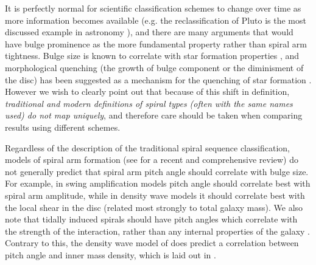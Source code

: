 \documentclass[usenatbib]{mn2e}
\begin{document}
It is perfectly normal for scientific classification schemes to change over time as more information becomes available (e.g. the reclassification of Pluto is the most discussed example in astronomy \citep{Messeri}), and there are many arguments that would have bulge prominence as the more fundamental property rather than spiral arm tightness. Bulge size is known to correlate with star formation properties \citep[e.g.][]{Cheung2012,Fang2013}, and morphological quenching (the growth of bulge component or the diminisment of the disc) has been suggested as a mechanism for the quenching of star formation \citep{Martig2009}. However we wish to clearly point out that because of this shift in definition, {\it traditional and modern definitions of spiral types (often with the same names used) do not map uniquely}, and therefore care should be taken when comparing results using different schemes.  


 Regardless of the description of the traditional spiral sequence classification, models of spiral arm formation (see \citealt{DobbsBaba2014} for a recent and comprehensive review) do not generally predict that spiral arm pitch angle should correlate with bulge size. For example, in swing amplification models pitch angle should correlate best with spiral arm amplitude, while in density wave models it should correlate best with the local shear in the disc (related most strongly to total galaxy mass). We also note that tidally induced spirals should have pitch angles which correlate with the strength of the interaction, rather than any internal properties of the galaxy \citep{Kendall2011}. %
Contrary to this, the density wave model of \citet{LinShu1964} does predict a correlation between pitch angle and inner mass density, which is laid out in \citet{Davis2015}. 
 
\end{document}

